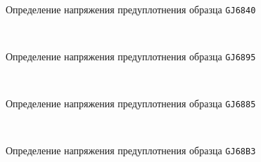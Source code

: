    \begin{figure}
        {\centering
        \small
            \hfill 
            \\
            \hfill  
            \hfill 
        }
        \caption{Определение напряжения предуплотнения образца \texttt{GJ6840}}
        \label{img:6840}
    \end{figure}
    
    \begin{figure}
        {\centering
        \small
            \hfill 
            \\
            \hfill  
            \hfill  
            }
            \caption{Определение напряжения предуплотнения образца \texttt{GJ6895}}
            \label{img:6895}
    \end{figure}
    
    \begin{figure}
        {\centering
            \small
            \hfill 
            \\
            \hfill  
            \hfill  
            }
            \caption{Определение напряжения предуплотнения образца \texttt{GJ6885}}
            \label{img:6885}
    \end{figure}
    
    \begin{figure}
        {\centering
            \small
            \hfill 
            \\
            \hfill   
            \hfill 
            }
            \caption{Определение напряжения предуплотнения образца \texttt{GJ68B3}}
            \label{img:68B3}
    \end{figure}